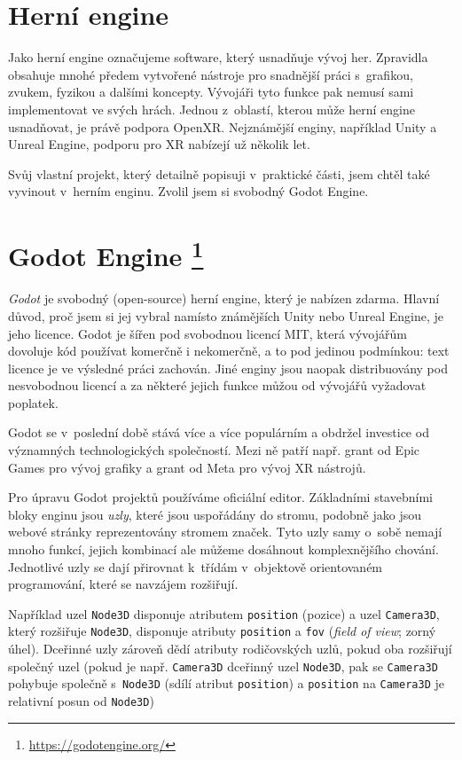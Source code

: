 \section{Herní engine}

Jako herní engine označujeme software, který usnadňuje vývoj her. Zpravidla obsahuje mnohé předem vytvořené nástroje pro snadnější práci s~grafikou, zvukem, fyzikou a dalšími koncepty. Vývojáři tyto funkce pak nemusí sami implementovat ve svých hrách. Jednou z~oblastí, kterou může herní engine usnadňovat, je právě podpora OpenXR. Nejznámější enginy, například Unity a Unreal Engine, podporu pro XR nabízejí už několik let. \cite{enwiki:1186405367}

Svůj vlastní projekt, který detailně popisuji v~praktické části, jsem chtěl také vyvinout v~herním enginu. Zvolil jsem si svobodný Godot Engine.

\section[Godot Engine]{Godot Engine \protect\footnote{\url{https://godotengine.org/}}}

\textit{Godot} je svobodný (open-source) herní engine, který je nabízen zdarma. Hlavní důvod, proč jsem si jej vybral namísto známějších Unity nebo Unreal Engine, je jeho licence. Godot je šířen pod svobodnou licencí MIT, která vývojářům dovoluje kód používat komerčně i nekomerčně, a to pod jedinou podmínkou: text licence je ve výsledné práci zachován. Jiné enginy jsou naopak distribuovány pod nesvobodnou licencí a za některé jejich funkce můžou od vývojářů vyžadovat poplatek.

Godot se v~poslední době stává více a více populárním a obdržel investice od významných technologických společností. Mezi ně patří např. grant od Epic Games pro vývoj grafiky a grant od Meta pro vývoj XR nástrojů. \cite{godot_epicgames} \cite{godot_meta}

Pro úpravu Godot projektů používáme oficiální editor. Základními stavebními bloky enginu jsou \textit{uzly}, které jsou uspořádány do stromu, podobně jako jsou webové stránky reprezentovány stromem značek. Tyto uzly samy o~sobě nemají mnoho funkcí, jejich kombinací ale můžeme dosáhnout komplexnějšího chování. Jednotlivé uzly se dají přirovnat k~třídám v~objektově orientovaném programování, které se navzájem rozšiřují.

Například uzel \texttt{Node3D} disponuje atributem \texttt{position} (pozice) a uzel \texttt{Camera3D}, který rozšiřuje \texttt{Node3D}, disponuje atributy \texttt{position} a \texttt{fov} (\textit{field of view}; zorný úhel). Dceřinné uzly zároveň dědí atributy rodičovských uzlů, pokud oba rozšiřují společný uzel (pokud je např. \texttt{Camera3D} dceřinný uzel \texttt{Node3D}, pak se \texttt{Camera3D} pohybuje společně s~\texttt{Node3D} (sdílí atribut \texttt{position}) a \texttt{position} na \texttt{Camera3D} je relativní posun od \texttt{Node3D})

